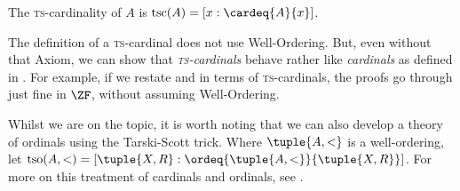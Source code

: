 \documentclass[../../../include/open-logic-section]{subfiles}
\begin{document}
\begin{defn}
The \textsc{ts}-cardinality of $A$ is $\text{tsc}(A) = [x :
\cardeq{A}{x}]$.
\end{defn}

The definition of a \textsc{ts}-cardinal does not use Well-Ordering.
But, even without that Axiom, we can show that
\emph{\textsc{ts}-cardinals} behave rather like \emph{cardinals} as
defined in .
For example, if we restate
 and
 in terms of
\textsc{ts}-cardinals, the proofs go through just fine in $\ZF$,
without assuming Well-Ordering. 

Whilst we are on the topic, it is worth noting that we can also
develop a theory of ordinals using the Tarski-Scott trick. Where
$\tuple{A, <}$ is a well-ordering, let $\text{tso}(A, <) = [\tuple{X,
R} : \ordeq{\tuple{A, <}}{\tuple{X, R}}]$. For more on this treatment
of cardinals and ordinals, see \citet[chs.~9--12]{Potter2004}.
\end{document}
